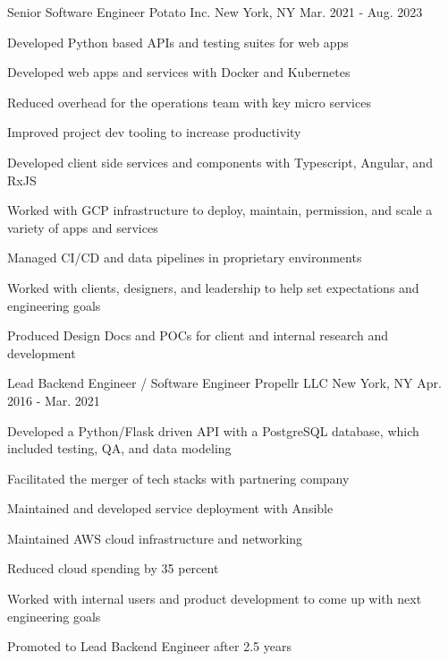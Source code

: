 \begin{cventries}
\cventry
{Senior Software Engineer} %
{Potato Inc.} %
{New York, NY} %
{Mar. 2021 - Aug. 2023} %
{ %
\begin{cvitems}
\item {Developed Python based APIs and testing suites for web apps}
\item {Developed web apps and services with Docker and Kubernetes}
\item {Reduced overhead for the operations team with key micro services}
\item {Improved project dev tooling to increase productivity}
\item {Developed client side services and components with Typescript, Angular, and RxJS}
\item {Worked with GCP infrastructure to deploy, maintain, permission, and scale a variety of apps and services}
\item {Managed CI/CD and data pipelines in proprietary environments}
\item {Worked with clients, designers, and leadership to help set expectations and engineering goals}
\item {Produced Design Docs and POCs for client and internal research and development}
\end{cvitems}
\bigskip
}


\cventry
{Lead Backend Engineer / Software Engineer} %
{Propellr LLC} %
{New York, NY} %
{Apr. 2016 - Mar. 2021} %
{ %
\begin{cvitems}
\item {Developed a Python/Flask driven API with a PostgreSQL database, which included testing, QA, and data modeling}
\item {Facilitated the merger of tech stacks with partnering company}
\item {Maintained and developed service deployment with Ansible}
\item {Maintained AWS cloud infrastructure and networking}
\item {Reduced cloud spending by 35 percent}
\item {Worked with internal users and product development to come up with next engineering goals}
\item {Promoted to Lead Backend Engineer after 2.5 years}
\end{cvitems}
\bigskip
}


\end{cventries}
